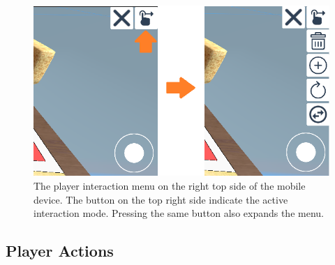 \begin{figure}[htb]
    \centering
    \includegraphics[width=1\textwidth]{Implementation/img/menu.png}
    \caption{The player interaction menu on the right top side of the mobile device. The button on the top right side indicate the active interaction mode. Pressing the same button also expands the menu.}\label{fig:menu}
\end{figure}

\subsection{Player Actions}
\label{sec:player_actions}
